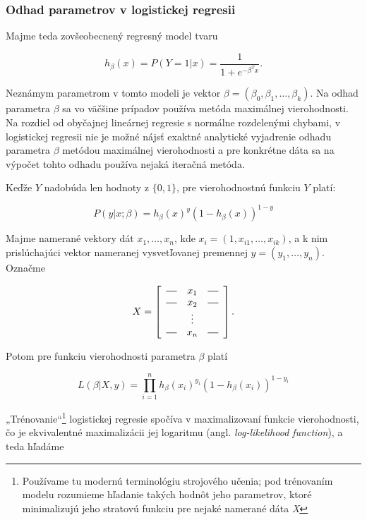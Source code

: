 \subsubsection{Odhad parametrov v logistickej regresii}

Majme teda zovšeobecnený regresný model tvaru

\[
h_\beta(x) = P(Y = 1|x) = \frac{1}{1 + e^{-\beta^T x}}.
\]

Neznámym parametrom v tomto modeli je vektor \( \beta = (\beta_0, \beta_1, \ldots, \beta_k) \).
Na odhad parametra \( \beta \) sa vo väčšine prípadov používa metóda maximálnej vierohodnosti.
Na rozdiel od obyčajnej lineárnej regresie s normálne rozdelenými chybami,
v logistickej regresii nie je možné nájsť exaktné analytické vyjadrenie odhadu parametra \( \beta \) metódou maximálnej vierohodnosti
a pre konkrétne dáta sa na výpočet tohto odhadu používa nejaká iteračná metóda.

Keďže \(Y\) nadobúda len hodnoty z \( \{0, 1\} \), pre vierohodnostnú funkciu \(Y\) platí:

\[
P(y | x; \beta ) = h_\beta(x)^y (1 - h_\beta(x))^{1 - y}
\]

Majme namerané vektory dát \( x_1, \ldots, x_n \), kde \( x_i = (1, x_{i1}, \ldots, x_{ik}) \),
a k nim prislúchajúci vektor nameranej vysvetľovanej premennej \(y = (y_1, \ldots, y_n )\). Označme

\[
    X =
    \left[
        \begin{array}{ccc}
            \horzbar & x_{1} & \horzbar \\
            \horzbar & x_{2} & \horzbar \\
                    & \vdots    &          \\
            \horzbar & x_{n} & \horzbar
        \end{array}
    \right].
\]


Potom pre funkciu vierohodnosti parametra \( \beta \) platí

\[
L(\beta | X, y) = \prod_{i = 1}^n h_\beta(x_i)^{y_i} (1 - h_\beta(x_i))^{1 - y_i}
\]

„Trénovanie“\footnote{Používame tu modernú terminológiu strojového učenia; pod trénovaním  modelu rozumieme hľadanie takých hodnôt jeho parametrov, ktoré minimalizujú jeho stratovú funkciu pre nejaké namerané dáta \emph{X}}
logistickej regresie spočíva v maximalizovaní funkcie vierohodnosti,
čo je ekvivalentné maximalizácii jej logaritmu (angl. \emph{log-likelihood function}), a teda hľadáme

